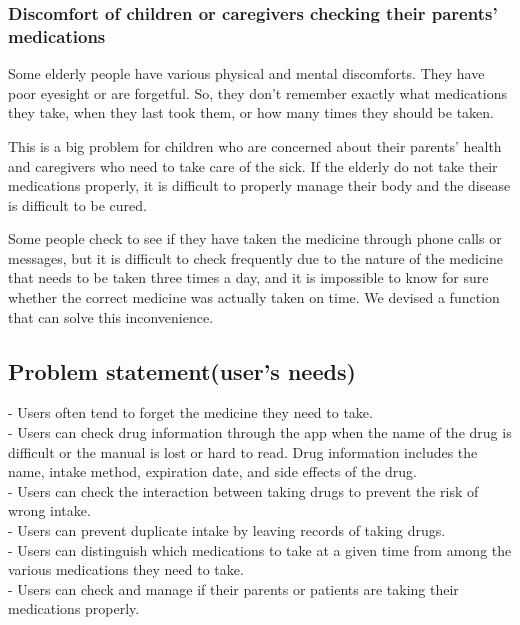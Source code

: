 \documentclass[conference]{IEEEtran}
\begin{document}
\subsubsection{Discomfort of children or caregivers checking their parents' medications}
Some elderly people have various physical and mental discomforts. They have poor eyesight or are forgetful. So, they don't remember exactly what medications they take, when they last took them, or how many times they should be taken.

This is a big problem for children who are concerned about their parents' health and caregivers who need to take care of the sick. If the elderly do not take their medications properly, it is difficult to properly manage their body and the disease is difficult to be cured.

Some people check to see if they have taken the medicine through phone calls or messages, but it is difficult to check frequently due to the nature of the medicine that needs to be taken three times a day, and it is impossible to know for sure whether the correct medicine was actually taken on time. We devised a function that can solve this inconvenience.\\

\subsection{Problem statement(user's needs)}
- Users often tend to forget the medicine they need to take.\\

- Users can check drug information through the app when the name of the drug is difficult or the manual is lost or hard to read. Drug information includes the name, intake method, expiration date, and side effects of the drug.\\

- Users can check the interaction between taking drugs to prevent the risk of wrong intake.\\

- Users can prevent duplicate intake by leaving records of taking drugs.\\

- Users can distinguish which medications to take at a given time from among the various medications they need to take. \\

- Users can check and manage if their parents or patients are taking their medications properly.\\
\end{document}
